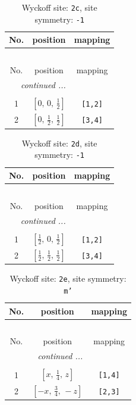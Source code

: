 \documentclass[fleqn,8pt]{jsarticle}
\begin{document}
\begin{longtable}{ccc}
\caption{Wyckoff site: {\tt 2c}, site symmetry: {\tt -1}}
 \\
 \hline \hline
No. & position & mapping \\ \hline \endfirsthead

\multicolumn{2}{l}{\tablename\ \thetable{}} \\
 \hline \hline
No. & position & mapping \\ \hline \endhead

 \hline \hline
\multicolumn{2}{r}{\footnotesize\it continued ...} \\ \endfoot

 \hline \hline
\multicolumn{2}{r}{} \\ \endlastfoot

1 & $\left[ 0,\, 0,\, \frac{1}{2} \right]$ & {\tt [1,2]} \\ \hline
2 & $\left[ 0,\, \frac{1}{2},\, \frac{1}{2} \right]$ & {\tt [3,4]} \\
\end{longtable}
\renewcommand{\arraystretch}{1.2}
\begin{longtable}{ccc}
\caption{Wyckoff site: {\tt 2d}, site symmetry: {\tt -1}}
 \\
 \hline \hline
No. & position & mapping \\ \hline \endfirsthead

\multicolumn{2}{l}{\tablename\ \thetable{}} \\
 \hline \hline
No. & position & mapping \\ \hline \endhead

 \hline \hline
\multicolumn{2}{r}{\footnotesize\it continued ...} \\ \endfoot

 \hline \hline
\multicolumn{2}{r}{} \\ \endlastfoot

1 & $\left[ \frac{1}{2},\, 0,\, \frac{1}{2} \right]$ & {\tt [1,2]} \\ \hline
2 & $\left[ \frac{1}{2},\, \frac{1}{2},\, \frac{1}{2} \right]$ & {\tt [3,4]} \\
\end{longtable}
\renewcommand{\arraystretch}{1.2}
\begin{longtable}{ccc}
\caption{Wyckoff site: {\tt 2e}, site symmetry: {\tt m'}}
 \\
 \hline \hline
No. & position & mapping \\ \hline \endfirsthead

\multicolumn{2}{l}{\tablename\ \thetable{}} \\
 \hline \hline
No. & position & mapping \\ \hline \endhead

 \hline \hline
\multicolumn{2}{r}{\footnotesize\it continued ...} \\ \endfoot

 \hline \hline
\multicolumn{2}{r}{} \\ \endlastfoot

1 & $\left[ x,\, \frac{1}{4},\, z \right]$ & {\tt [1,4]} \\ \hline
2 & $\left[ - x,\, \frac{3}{4},\, - z \right]$ & {\tt [2,3]} \\
\end{longtable}
\end{document}
